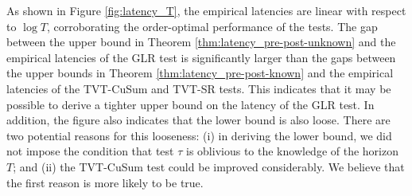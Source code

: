 \documentclass[12pt]{interact}
\newcommand{\lbp}{\left\{}
\newcommand{\rbp}{\right\}}
\newcommand{\mrm}{\mathrm}
\theoremstyle{plain}
\newcommand{\yhh}[1]{{\color{purple}{#1}}}
\begin{document}
As shown in Figure \ref{fig:latency_T}, the empirical latencies are linear with respect to $\log T$, corroborating the order-optimal performance of the tests. The gap between the upper bound in Theorem \ref{thm:latency_pre-post-unknown} and the empirical latencies of the GLR test is significantly larger than the gaps between the upper bounds in Theorem \ref{thm:latency_pre-post-known} and the empirical latencies of the TVT-CuSum and TVT-SR tests. This indicates that it may be possible to derive a tighter upper bound on the latency of the GLR test. In addition, the figure also indicates that the lower bound is also loose. There are two potential reasons for this looseness: (i) in deriving the lower bound, we did not impose the condition that test $\tau$ is oblivious to the knowledge of the horizon $T$; and (ii) the TVT-CuSum test could be improved considerably. We believe that the first reason is more likely to be true.


\end{document}
